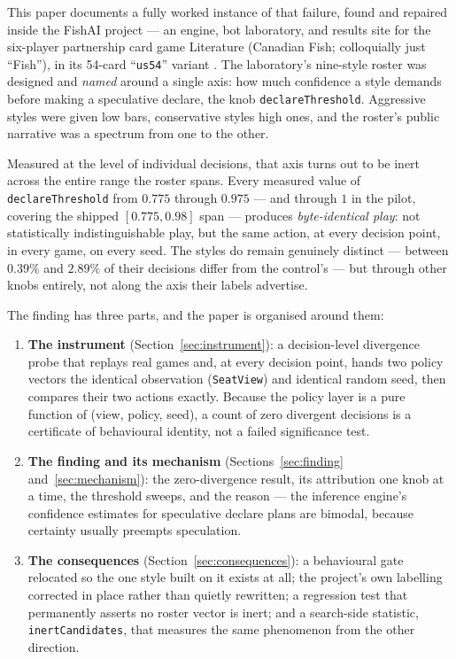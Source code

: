\documentclass[11pt]{article}
\newcommand{\code}[1]{\texttt{#1}}
\begin{document}
This paper documents a fully worked instance of that failure, found and repaired inside the
FishAI project --- an engine, bot laboratory, and results site for the six-player partnership card
game Literature (Canadian Fish; colloquially just ``Fish''), in its 54-card ``\code{us54}'' variant
\cite{rules}. The laboratory's nine-style roster \cite{styles, v05} was designed and \emph{named}
around a single axis: how much confidence a style demands before making a speculative declare,
the knob \code{declareThreshold}. Aggressive styles were given low bars, conservative styles high
ones, and the roster's public narrative was a spectrum from one to the other.

Measured at the level of individual decisions, that axis turns out to be inert across the entire
range the roster spans. Every measured value of \code{declareThreshold} from $0.775$ through
$0.975$ --- and through $1$ in the pilot, covering the shipped $[0.775, 0.98]$ span ---
produces \emph{byte-identical play}: not statistically indistinguishable play, but the same
action, at every decision point, in every game, on every seed. The styles do remain genuinely
distinct --- between $0.39\%$ and $2.89\%$ of their decisions differ from the control's --- but
through other knobs entirely, not along the axis their labels advertise.

The finding has three parts, and the paper is organised around them:

\begin{enumerate}
  \item \textbf{The instrument} (Section~\ref{sec:instrument}): a decision-level divergence probe
  that replays real games and, at every decision point, hands two policy vectors the identical
  observation (\code{SeatView}) and identical random seed, then compares their two actions
  exactly. Because the policy layer is a pure function of (view, policy, seed), a count of zero
  divergent decisions is a certificate of behavioural identity, not a failed significance test.
  \item \textbf{The finding and its mechanism} (Sections~\ref{sec:finding}
  and~\ref{sec:mechanism}): the zero-divergence result, its attribution one knob at a time, the
  threshold sweeps, and the reason --- the inference engine's confidence estimates for
  speculative declare plans are bimodal, because certainty usually preempts speculation.
  \item \textbf{The consequences} (Section~\ref{sec:consequences}): a behavioural gate relocated
  so the one style built on it exists at all; the project's own labelling corrected in place
  rather than quietly rewritten; a regression test that permanently asserts no roster vector is
  inert; and a search-side statistic, \code{inertCandidates}, that measures the same phenomenon
  from the other direction.
\end{enumerate}
\end{document}
